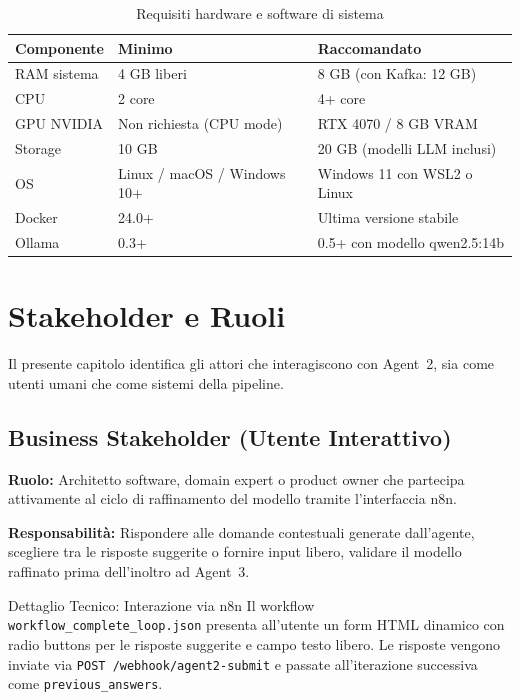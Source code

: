 \documentclass[12pt,a4paper]{report}
\begin{document}
\begin{table}[H]
\centering
\renewcommand{\arraystretch}{1.3}
\begin{tabular}{llp{5.5cm}}
\toprule
\textbf{Componente} & \textbf{Minimo} & \textbf{Raccomandato} \\
\midrule
RAM sistema & 4 GB liberi & 8 GB (con Kafka: 12 GB) \\
CPU & 2 core & 4+ core \\
GPU NVIDIA & Non richiesta (CPU mode) & RTX 4070 / 8 GB VRAM \\
Storage & 10 GB & 20 GB (modelli LLM inclusi) \\
OS & Linux / macOS / Windows 10+ & Windows 11 con WSL2 o Linux \\
Docker & 24.0+ & Ultima versione stabile \\
Ollama & 0.3+ & 0.5+ con modello qwen2.5:14b \\
\bottomrule
\end{tabular}
\caption{Requisiti hardware e software di sistema}
\label{tab:system-requirements}
\end{table}

\chapter{Stakeholder e Ruoli}

Il presente capitolo identifica gli attori che interagiscono con Agent~2,
sia come utenti umani che come sistemi della pipeline.

\section{Business Stakeholder (Utente Interattivo)}

\textbf{Ruolo:} Architetto software, domain expert o product owner che partecipa
attivamente al ciclo di raffinamento del modello tramite l'interfaccia n8n.

\textbf{Responsabilità:} Rispondere alle domande contestuali generate dall'agente,
scegliere tra le risposte suggerite o fornire input libero, validare il modello
raffinato prima dell'inoltro ad Agent~3.

\begin{technicalbox}{Dettaglio Tecnico: Interazione via n8n}
Il workflow \texttt{workflow\_complete\_loop.json} presenta all'utente un form HTML
dinamico con radio buttons per le risposte suggerite e campo testo libero.
Le risposte vengono inviate via \texttt{POST /webhook/agent2-submit} e passate
all'iterazione successiva come \texttt{previous\_answers}.
\end{technicalbox}
\end{document}
